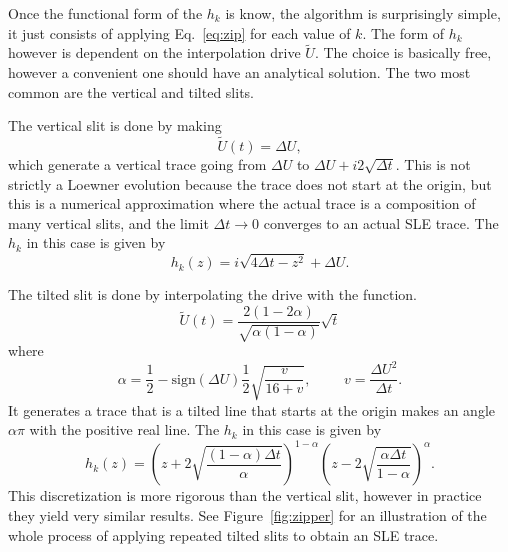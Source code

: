 Once the functional form of the $h_k$ is know, the algorithm is surprisingly
simple, it just consists of applying Eq.~\ref{eq:zip} for each value of $k$.
The form of $h_k$ however is dependent on the interpolation drive $\tilde{U}$.
The choice is basically free, however a convenient one should have an
analytical solution. The two most common are the vertical and tilted slits.

The vertical slit is done by making
\begin{equation}
    \tilde{U}(t)=\Delta U,
\end{equation}
which generate a vertical trace going from $\Delta U$ to $\Delta U +
i2\sqrt{\Delta t}$. This is not strictly a Loewner evolution because the trace
does not start at the origin, but this is a numerical approximation where the
actual trace is a composition of many vertical slits, and the limit $\Delta t
\rightarrow 0$ converges to an actual SLE trace. The $h_k$ in this case is
given by~\cite{Kager2004b}
\begin{equation}
    \label{eq:vslit}
    h_{k}(z)=i\sqrt{4\Delta t-z^{2}}+\Delta U.
\end{equation}

The tilted slit is done by interpolating the drive with the function.
\begin{equation}
    \tilde{U}(t)=
        \frac{2\left(1-2\alpha\right)}
             {\sqrt{\alpha\left(1-\alpha\right)}}
        \sqrt{t}
\end{equation}
where
\begin{equation}
    \alpha=\frac{1}{2}-
    \mbox{sign}\left(\Delta U\right)\frac{1}{2}\sqrt{\frac{v}{16+v}},
    \,\,\,\,\,\,\,\,\,\,\,\,\,\,
    v=\frac{\Delta U^{2}}{\Delta t}.
\end{equation}
It generates a trace that is a tilted line that starts at the origin makes an
angle $\alpha\pi$ with the positive real line. The $h_k$ in this case is
given by
\begin{equation}
    h_{k}(z) = 
    {\left(
        z+2\sqrt{\frac{\left(1-\alpha\right)\Delta t}{\alpha}}
    \right)}^{1-\alpha}
    {\left(
        z-2\sqrt{\frac{\alpha\Delta t}{1-\alpha}}
    \right)}^{\alpha}.
\end{equation}
This discretization is more rigorous than the vertical slit, however in
practice they yield very similar results. See Figure~\ref{fig:zipper} for an
illustration of the whole process of applying repeated tilted slits to obtain
an SLE trace.

